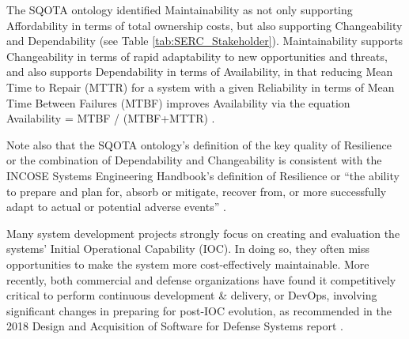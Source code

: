 The SQOTA ontology identified Maintainability as not only supporting Affordability in terms of total ownership costs, but also supporting Changeability and Dependability (see Table \ref{tab:SERC_Stakeholder}). Maintainability supports Changeability in terms of rapid adaptability to new opportunities and threats, and also supports Dependability in terms of Availability, in that reducing Mean Time to Repair (MTTR) for a system with a given Reliability in terms of Mean Time Between Failures (MTBF) improves Availability via the equation Availability = MTBF / (MTBF+MTTR) \cite{IIS2:IIS2278}.

Note also that the SQOTA ontology’s definition of the key quality of Resilience or the combination of Dependability and Changeability is consistent with the INCOSE Systems Engineering Handbook’s definition of Resilience or “the ability to prepare and plan for, absorb or mitigate, recover from, or more successfully adapt to actual or potential adverse events”
\cite{incose2015systems,haimes2012systems}.

Many system development projects strongly focus on creating and evaluation the systems’ Initial Operational Capability (IOC). In doing so, they often miss opportunities to make the system more cost-effectively maintainable. 
More recently, both commercial and defense organizations have found it competitively critical to perform continuous development \& delivery, or DevOps, involving significant changes in preparing for post-IOC evolution, as recommended in the 2018 Design and Acquisition of Software for Defense Systems report \cite{DefenseScienceBoard}.

